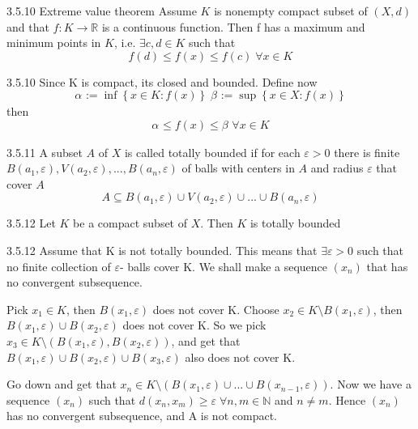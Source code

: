 \documentclass[a4paper,norsk]{article}
\renewcommand{\geq}{\geqslant}
\renewcommand{\leq}{\leqslant}
\renewcommand{\epsilon}{\varepsilon}
\begin{document}
\begin{theorembox}{3.5.10 Extreme value theorem}{}
Assume $ K $ is nonempty compact subset of $ \left( X, d \right)  $ and that $ f : K \to \mathbb{R} $ is a continuous function. Then f has a maximum and minimum points in $ K $, i.e. $ \exists  c, d \in K $ such that
\[
    f \left( d \right) \leq f \left( x \right) \leq f \left( c \right) \; \forall x \in K
\]


\begin{proofbox}{3.5.10}{}
  Since K is compact, its closed and bounded. Define now
  \[
      \alpha_{  }^{} := \inf \left\{ x \in K : f(x) \right\} \; \beta_{}^{} := \sup \left\{ x \in X : f(x) \right\} 
  \]
  then 
  \[
      \alpha_{}^{} \leq f(x) \leq \beta_{}^{} \; \forall x \in  K
  \]
  
\end{proofbox}
\end{theorembox}

\begin{definitionbox}{3.5.11}{}
A subset $ A $ of $ X $ is called totally bounded if for each $ \epsilon > 0 $ there is finite $ B \left( a_1, \epsilon  \right), V \left( a_2, \epsilon  \right), ..., B \left( a_n, \epsilon  \right)    $ of balls with centers in $ A $ and radius $ \epsilon  $ that cover $ A $
\[
    A \subseteq B \left( a_1, \epsilon  \right) \cup V \left( a_2, \epsilon  \right) \cup ... \cup B \left( a_n, \epsilon  \right)
\]
\end{definitionbox}


\begin{propositionbox}{3.5.12}{}
Let $ K $ be a compact subset of $ X $. Then $ K $ is totally bounded

\begin{proofbox}{3.5.12}{}
  Assume that K is not totally bounded. This means that $ \exists \epsilon > 0 $ such that no finite collection of $ \epsilon  $- balls cover K. We shall make a sequence $ \left( x_n \right)  $ that has no convergent subsequence.

  Pick $ x_1 \in K $, then $ B \left( x_1, \epsilon  \right)  $ does not cover K. Choose $ x_2 \in  K \setminus B \left( x_1, \epsilon  \right)  $, then $ B \left( x_1, \epsilon  \right) \cup B \left( x_2, \epsilon  \right)   $ does not cover K. So we pick $ x_3 \in K \setminus \left( B \left( x_1, \epsilon \right), B \left( x_2, \epsilon  \right)   \right)  $, and get that $ B \left( x_1, \epsilon  \right) \cup B \left( x_2, \epsilon  \right) \cup B \left( x_3, \epsilon  \right)    $ also does not cover K.


  Go down and get that $ x_n \in K \setminus \left( B \left( x_1, \epsilon   \right) \cup ... \cup B \left( x_{n-1}, \epsilon  \right)   \right)  $. Now we have a sequence $ \left( x_n \right)  $ such that $ d \left( x_n, x_m \right) \geq \epsilon \; \forall n, m \in \mathbb{N} $ and $ n \neq m $. Hence $ \left( x_n \right)  $ has no convergent subsequence, and A is not compact. 
\end{proofbox}
\end{propositionbox}
\end{document}
